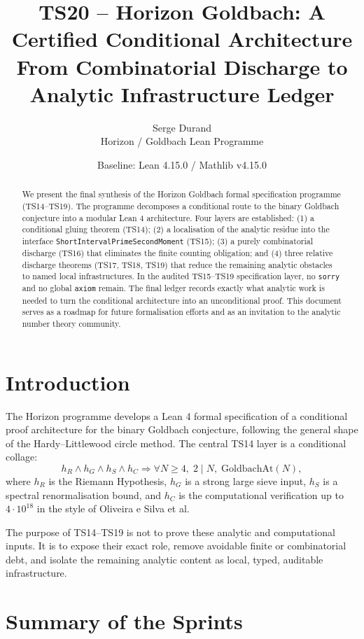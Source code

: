 \documentclass[11pt]{article}
\title{TS20 -- Horizon Goldbach: A Certified Conditional Architecture\\
\large From Combinatorial Discharge to Analytic Infrastructure Ledger}
\author{Serge Durand\\Horizon / Goldbach Lean Programme}
\date{Baseline: Lean 4.15.0 / Mathlib v4.15.0}
\newcommand{\code}[1]{\texttt{#1}}
\begin{document}
\maketitle

\begin{abstract}
We present the final synthesis of the Horizon Goldbach formal specification
programme (TS14--TS19). The programme decomposes a conditional route to the
binary Goldbach conjecture into a modular Lean 4 architecture. Four layers are
established: (1) a conditional gluing theorem (TS14); (2) a localisation of the
analytic residue into the interface \code{ShortIntervalPrimeSecondMoment}
(TS15); (3) a purely combinatorial discharge (TS16) that eliminates the finite
counting obligation; and (4) three relative discharge theorems (TS17, TS18,
TS19) that reduce the remaining analytic obstacles to named local
infrastructures. In the audited TS15--TS19 specification layer, no \code{sorry}
and no global \code{axiom} remain. The final ledger records exactly what
analytic work is needed to turn the conditional architecture into an
unconditional proof. This document serves as a roadmap for future formalisation
efforts and as an invitation to the analytic number theory community.
\end{abstract}

\section{Introduction}

The Horizon programme develops a Lean 4 formal specification of a conditional
proof architecture for the binary Goldbach conjecture, following the general
shape of the Hardy--Littlewood circle method. The central TS14 layer is a
conditional collage:
\[
  h_R \wedge h_G \wedge h_S \wedge h_C
  \Longrightarrow
  \forall N\ge 4,\; 2\mid N,\; \mathrm{GoldbachAt}(N),
\]
where \(h_R\) is the Riemann Hypothesis, \(h_G\) is a strong large sieve input,
\(h_S\) is a spectral renormalisation bound, and \(h_C\) is the computational
verification up to \(4\cdot10^{18}\) in the style of Oliveira e Silva et al.

The purpose of TS14--TS19 is not to prove these analytic and computational
inputs. It is to expose their exact role, remove avoidable finite or
combinatorial debt, and isolate the remaining analytic content as local,
typed, auditable infrastructure.

\section{Summary of the Sprints}
\end{document}
